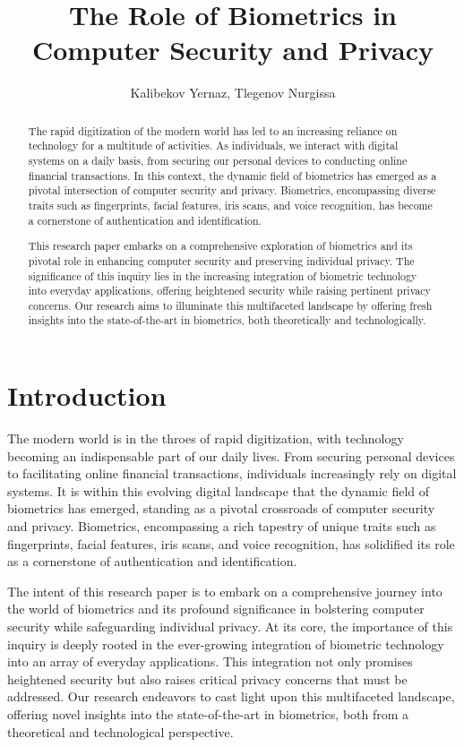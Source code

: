 \documentclass{IEEEtran}
\begin{document}
\title{The Role of Biometrics in Computer Security and Privacy}
\author{Kalibekov Yernaz, Tlegenov Nurgissa}
\maketitle

\begin{abstract}
The rapid digitization of the modern world has led to an increasing reliance on technology for a multitude of activities. As individuals, we interact with digital systems on a daily basis, from securing our personal devices to conducting online financial transactions. In this context, the dynamic field of biometrics has emerged as a pivotal intersection of computer security and privacy. Biometrics, encompassing diverse traits such as fingerprints, facial features, iris scans, and voice recognition, has become a cornerstone of authentication and identification.

This research paper embarks on a comprehensive exploration of biometrics and its pivotal role in enhancing computer security and preserving individual privacy. The significance of this inquiry lies in the increasing integration of biometric technology into everyday applications, offering heightened security while raising pertinent privacy concerns. Our research aims to illuminate this multifaceted landscape by offering fresh insights into the state-of-the-art in biometrics, both theoretically and technologically.
\end{abstract}

\section{Introduction}
The modern world is in the throes of rapid digitization, with technology becoming an indispensable part of our daily lives. From securing personal devices to facilitating online financial transactions, individuals increasingly rely on digital systems. It is within this evolving digital landscape that the dynamic field of biometrics has emerged, standing as a pivotal crossroads of computer security and privacy. Biometrics, encompassing a rich tapestry of unique traits such as fingerprints, facial features, iris scans, and voice recognition, has solidified its role as a cornerstone of authentication and identification.

The intent of this research paper is to embark on a comprehensive journey into the world of biometrics and its profound significance in bolstering computer security while safeguarding individual privacy. At its core, the importance of this inquiry is deeply rooted in the ever-growing integration of biometric technology into an array of everyday applications. This integration not only promises heightened security but also raises critical privacy concerns that must be addressed. Our research endeavors to cast light upon this multifaceted landscape, offering novel insights into the state-of-the-art in biometrics, both from a theoretical and technological perspective.
\end{document}
